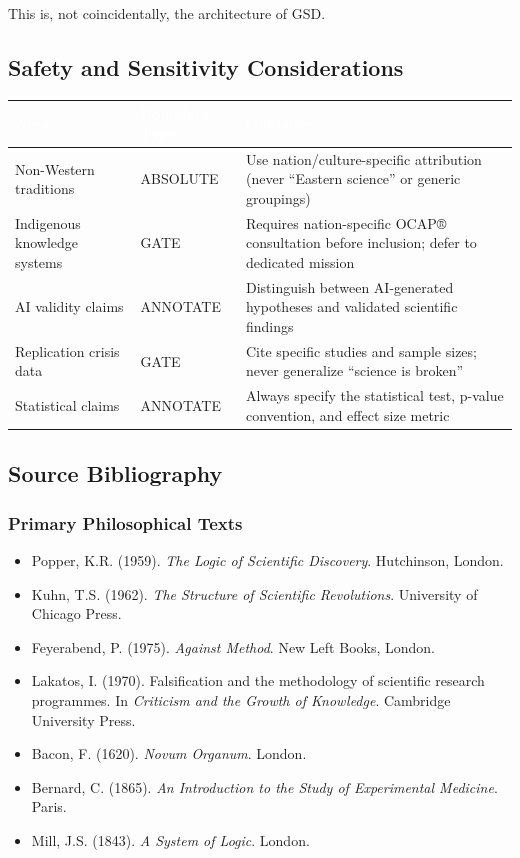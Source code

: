 \documentclass[11pt,letterpaper]{article}
\newcommand{\tableheader}[1]{\textbf{\sffamily\textcolor{white}{#1}}}
\begin{document}
This is, not coincidentally, the architecture of GSD.

\subsection{Safety and Sensitivity Considerations}

\begin{center}
\begin{tabularx}{\textwidth}{L{4cm}L{3.5cm}X}
\toprule
{}
\tableheader{Area} & \tableheader{Boundary Type} & \tableheader{Guidance} \\
\midrule
Non-Western traditions & ABSOLUTE & Use nation/culture-specific attribution (never ``Eastern science'' or generic groupings) \\
Indigenous knowledge systems & GATE & Requires nation-specific OCAP® consultation before inclusion; defer to dedicated mission \\
AI validity claims & ANNOTATE & Distinguish between AI-generated hypotheses and validated scientific findings \\
Replication crisis data & GATE & Cite specific studies and sample sizes; never generalize ``science is broken'' \\
Statistical claims & ANNOTATE & Always specify the statistical test, p-value convention, and effect size metric \\
\bottomrule
\end{tabularx}
\end{center}

\subsection{Source Bibliography}

\subsubsection{Primary Philosophical Texts}
\begin{itemize}[leftmargin=1.5em]
  \item Popper, K.R. (1959). \emph{The Logic of Scientific Discovery}. Hutchinson, London.
  \item Kuhn, T.S. (1962). \emph{The Structure of Scientific Revolutions}. University of Chicago Press.
  \item Feyerabend, P. (1975). \emph{Against Method}. New Left Books, London.
  \item Lakatos, I. (1970). Falsification and the methodology of scientific research programmes. In \emph{Criticism and the Growth of Knowledge}. Cambridge University Press.
  \item Bacon, F. (1620). \emph{Novum Organum}. London.
  \item Bernard, C. (1865). \emph{An Introduction to the Study of Experimental Medicine}. Paris.
  \item Mill, J.S. (1843). \emph{A System of Logic}. London.
\end{itemize}
\end{document}
